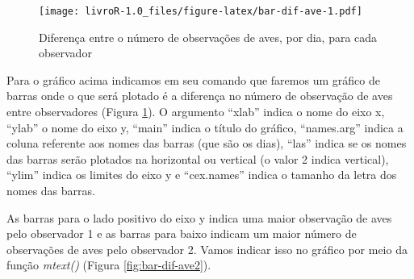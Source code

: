 \documentclass[titlepage, oneside, openany, a4paper]{book}
\newenvironment{Shaded}{\begin{snugshade}}{\end{snugshade}}
\newcommand{\DataTypeTok}[1]{\textcolor[rgb]{0.13,0.29,0.53}{#1}}
\newcommand{\DecValTok}[1]{\textcolor[rgb]{0.00,0.00,0.81}{#1}}
\newcommand{\FloatTok}[1]{\textcolor[rgb]{0.00,0.00,0.81}{#1}}
\newcommand{\KeywordTok}[1]{\textcolor[rgb]{0.13,0.29,0.53}{\textbf{#1}}}
\newcommand{\NormalTok}[1]{#1}
\newcommand{\OperatorTok}[1]{\textcolor[rgb]{0.81,0.36,0.00}{\textbf{#1}}}
\newcommand{\StringTok}[1]{\textcolor[rgb]{0.31,0.60,0.02}{#1}}
\begin{document}
\begin{figure}
\centering
\texttt{[image: livroR-1.0\_files/figure-latex/bar-dif-ave-1.pdf]}
\caption{\label{fig:bar-dif-ave}Diferença entre o número de observações de aves, por dia, para cada observador}
\end{figure}

Para o gráfico acima indicamos em seu comando que faremos um gráfico de barras onde o que será plotado é a diferença no número de observação de aves entre observadores (Figura \ref{fig:bar-dif-ave}). O argumento ``xlab'' indica o nome do eixo x, ``ylab'' o nome do eixo y, ``main'' indica o título do gráfico, ``names.arg'' indica a coluna referente aos nomes das barras (que são os dias), ``las'' indica se os nomes das barras serão plotados na horizontal ou vertical (o valor 2 indica vertical), ``ylim'' indica os limites do eixo y e ``cex.names'' indica o tamanho da letra dos nomes das barras.

As barras para o lado positivo do eixo y indica uma maior observação de aves pelo observador 1 e as barras para baixo indicam um maior número de observações de aves pelo observador 2. Vamos indicar isso no gráfico por meio da função \emph{mtext()} (Figura \ref{fig:bar-dif-ave2}).

\begin{Shaded}
\end{Shaded}
\end{document}
